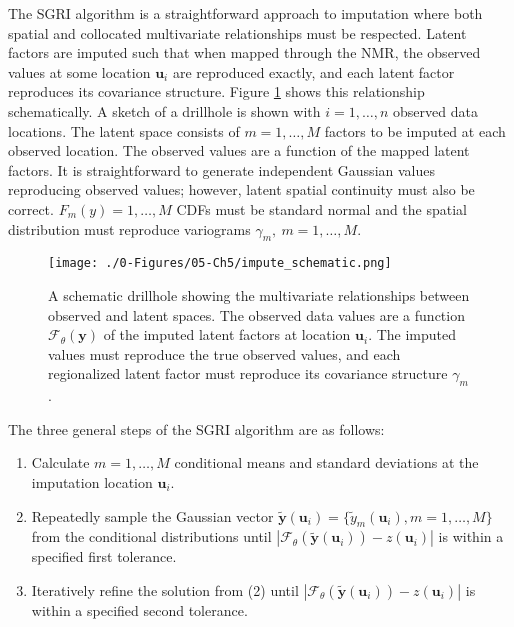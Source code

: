 The \gls{SGRI} algorithm is a straightforward approach to imputation where both spatial and collocated multivariate relationships must be respected. Latent factors are imputed such that when mapped through the \gls{NMR}, the observed values at some location $\mathbf{u}_{i}$ are reproduced exactly, and each latent factor reproduces its covariance structure. Figure \ref{fig:impute_schematic} shows this relationship schematically. A sketch of a drillhole is shown with $i=1,\dots,n$ observed data locations. The latent space consists of $m=1,\dots,M$ factors to be imputed at each observed location. The observed values are a function of the mapped latent factors. It is straightforward to generate independent Gaussian values reproducing observed values; however, latent spatial continuity must also be correct. $F_{m}(y)=1,\dots,M$ \glspl{CDF} must be standard normal and the spatial distribution must reproduce variograms $\gamma_{m}, \ m=1,\dots,M$.

\begin{figure}[htb!]
    \centering
    \texttt{[image: ./0-Figures/05-Ch5/impute\_schematic.png]}
    \caption{A schematic drillhole showing the multivariate relationships between observed and latent spaces. The observed data values are a function $\mathcal{F}_{\theta}\left(\mathbf{y}\right)$ of the imputed latent factors at location $\mathbf{u}_{i}$. The imputed values must reproduce the true observed values, and each regionalized latent factor must reproduce its covariance structure $\gamma_{m}$. }
    \label{fig:impute_schematic}
\end{figure}

The three general steps of the \gls{SGRI} algorithm are as follows:
\begin{enumerate}[noitemsep]
    \item Calculate $m=1,\dots,M$ conditional means and standard deviations at the imputation location $\mathbf{u}_{i}$.
    \item Repeatedly sample the Gaussian vector $\tilde{\mathbf{y}}(\mathbf{u}_{i}) = \{\tilde{y}_{m}(\mathbf{u}_{i}), m=1,\dots,M \}$ from the conditional distributions until $\left|\mathcal{F}_{\theta}(\tilde{\mathbf{y}}(\mathbf{u}_{i})) - z(\mathbf{u}_{i})\right|$ is within a specified first tolerance.
    \item Iteratively refine the solution from (2) until $\left|\mathcal{F}_{\theta}(\tilde{\mathbf{y}}(\mathbf{u}_{i})) - z(\mathbf{u}_{i})\right|$ is within a specified second tolerance.
\end{enumerate}

